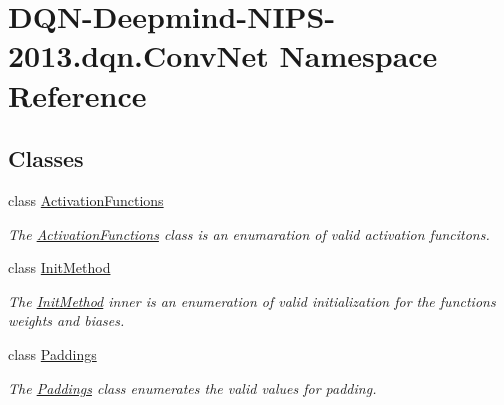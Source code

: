 \hypertarget{namespaceDQN-Deepmind-NIPS-2013_1_1dqn_1_1ConvNet}{}\section{D\+Q\+N-\/\+Deepmind-\/\+N\+I\+P\+S-\/2013.dqn.\+Conv\+Net Namespace Reference}
\label{namespaceDQN-Deepmind-NIPS-2013_1_1dqn_1_1ConvNet}
\subsection*{Classes}
\begin{DoxyCompactItemize}
\item 
class \hyperlink{classDQN-Deepmind-NIPS-2013_1_1dqn_1_1ConvNet_1_1ActivationFunctions}{Activation\+Functions}
\begin{DoxyCompactList}\small\item\em The \hyperlink{classDQN-Deepmind-NIPS-2013_1_1dqn_1_1ConvNet_1_1ActivationFunctions}{Activation\+Functions} class is an enumaration of valid activation funcitons. \end{DoxyCompactList}\item 
class \hyperlink{classDQN-Deepmind-NIPS-2013_1_1dqn_1_1ConvNet_1_1InitMethod}{Init\+Method}
\begin{DoxyCompactList}\small\item\em The \hyperlink{classDQN-Deepmind-NIPS-2013_1_1dqn_1_1ConvNet_1_1InitMethod}{Init\+Method} inner is an enumeration of valid initialization for the functions \textquotesingle{}weights\textquotesingle{} and \textquotesingle{}biases\textquotesingle{}. \end{DoxyCompactList}\item 
class \hyperlink{classDQN-Deepmind-NIPS-2013_1_1dqn_1_1ConvNet_1_1Paddings}{Paddings}
\begin{DoxyCompactList}\small\item\em The \hyperlink{classDQN-Deepmind-NIPS-2013_1_1dqn_1_1ConvNet_1_1Paddings}{Paddings} class enumerates the valid values for padding. \end{DoxyCompactList}\end{DoxyCompactItemize}
